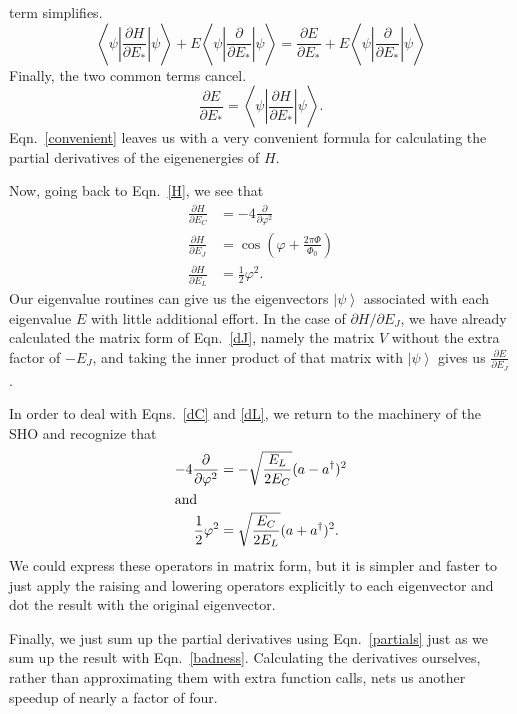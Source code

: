 \documentclass[twocolumn]{revtex4}
\newcommand{\ket}[1]{\left| #1 \right>}
\newcommand{\innerp}[3]{\textstyle\left< #1 \left| #2 \right| #3 \right>}
\begin{document}
term simplifies.
\begin{equation}
  \innerp{\psi}{\frac{\partial H}{\partial E_*}}{\psi} +
  E\innerp{\psi}{\frac{\partial}{\partial E_*}}{\psi} =
  \frac{\partial E}{\partial E_*} +
  E\innerp{\psi}{\frac{\partial}{\partial E_*}}{\psi}
\end{equation}
Finally, the two common terms cancel.
\begin{equation}
  \frac{\partial E}{\partial E_*} =
  \innerp{\psi}{\frac{\partial H}{\partial E_*}}{\psi}.
  \label{convenient}
\end{equation}
Eqn.~\eqref{convenient} leaves us with a very convenient formula for
calculating the partial derivatives of the eigenenergies of $H$.

Now, going back to Eqn.~\eqref{H}, we see that
\begin{align}
  \label{dC}
  \frac{\partial H}{\partial E_C} &= -4\frac{\partial}{\partial
    \varphi^2}\\
  \label{dJ}
  \frac{\partial H}{\partial E_J} &= \cos(\varphi +
  \frac{2\pi\Phi}{\Phi_0})\\
  \label{dL}
  \frac{\partial H}{\partial E_L} &= \frac{1}{2}\varphi^2.
\end{align}
Our eigenvalue routines can give us the eigenvectors $\ket{\psi}$
associated with each eigenvalue $E$ with little additional effort. In
the case of $\partial H/\partial E_J$, we have already calculated the
matrix form of Eqn.~\eqref{dJ}, namely the matrix $V$ without the extra
factor of $-E_J$, and taking the inner product of that matrix with
$\ket{\psi}$ gives us $\frac{\partial E}{\partial E_J}$.

In order to deal with Eqns.~\eqref{dC} and \eqref{dL}, we return to the
machinery of the SHO and recognize that
\begin{align}
  -4\frac{\partial}{\partial \varphi^2} &= -\sqrt{\frac{E_L}{2E_C}}
  (a-a^\dagger)^2\\
  \intertext{and}
  \frac{1}{2}\varphi^2 &= \sqrt{\frac{E_C}{2E_L}} (a+a^\dagger)^2.
\end{align}
We could express these operators in matrix form, but it is simpler and
faster to just apply the raising and lowering operators explicitly to
each eigenvector and dot the result with the original eigenvector.

Finally, we just sum up the partial derivatives using
Eqn.~\eqref{partials} just as we sum up the result with
Eqn.~\eqref{badness}. Calculating the derivatives ourselves, rather than
approximating them with extra function calls, nets us another speedup
of nearly a factor of four.
\end{document}

